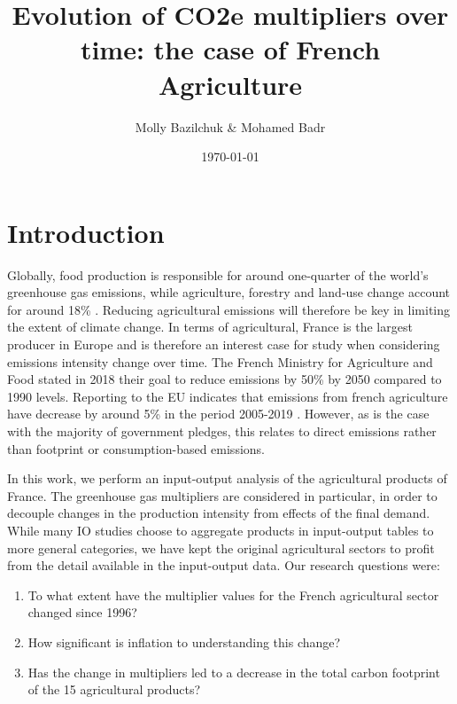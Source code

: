 \documentclass[a4paper,twoside]{article}
\title{Evolution of CO2e multipliers over time: the case of French Agriculture}
\author{Molly Bazilchuk & Mohamed Badr}
\date{\today}
\begin{document}
\maketitle
\vspace{3cm}


\section{Introduction}

Globally, food production is responsible for around one-quarter of the world's greenhouse gas emissions, while agriculture, forestry and land-use change account for around 18\% \cite{ritchie_roser_2020}. Reducing agricultural emissions will therefore be key in limiting the extent of climate change. In terms of agricultural, France is the largest producer in Europe and is therefore an interest case for study when considering emissions intensity change over time. The French Ministry for Agriculture and Food stated in 2018 their goal to reduce emissions by 50\% by 2050 compared to 1990 levels. Reporting to the EU indicates that emissions from french agriculture have decrease by around 5\% in the period 2005-2019 \cite{euAgricultureEmissions}. However, as is the case with the majority of government pledges, this relates to direct emissions rather than footprint or consumption-based emissions. 

In this work, we perform an input-output analysis of the agricultural products of France. The greenhouse gas multipliers are considered in particular, in order to decouple changes in the production intensity from effects of the final demand. While many IO studies choose to aggregate products in input-output tables to more general categories, we have kept the original agricultural sectors to profit from the detail available in the input-output data. Our research questions were:

\begin{enumerate}
\item To what extent have the multiplier values for the French agricultural sector changed since 1996? 
\item How significant is inflation to understanding this change? 
\item Has the change in multipliers led to a decrease in the total carbon footprint of the 15 agricultural products? 
\end{enumerate}
\end{document}
